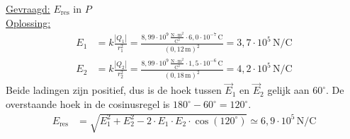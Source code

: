 \documentclass{ximera}
\begin{document}
\begin{exercise}
\begin{solution}
        \underline{Gevraagd:} $E_{\text{res}}$ in $P$\\

        \underline{Oplossing:}\\
        \begin{align*}
            E_{1} &= k \frac{|Q_{1}|}{r_{1}^{2}} = \frac{8{,}99 \cdot 10^{9} \, \mathrm{\frac{N \cdot m^2}{C^2}} \cdot 6{,}0 \cdot 10^{-7} \, \mathrm{C}}{(0{,}12 \, \mathrm{m})^{2}} = 3{,}7 \cdot 10^{5} \, \mathrm{N/C} \\
            E_{2} &= k \frac{|Q_{2}|}{r_{2}^{2}} = \frac{8{,}99 \cdot 10^{9} \, \mathrm{\frac{N \cdot m^2}{C^2}} \cdot 1{,}5 \cdot 10^{-6} \, \mathrm{C}}{(0{,}18 \, \mathrm{m})^{2}} = 4{,}2 \cdot 10^{5} \, \mathrm{N/C}
        \end{align*}
        Beide ladingen zijn positief, dus is de hoek tussen $\vec{E}_1$ en $\vec{E}_2$ gelijk aan $60^\circ$. De overstaande hoek in de cosinusregel is $180^\circ - 60^\circ = 120^\circ$.
        \begin{align*}
            E_{\text{res}} &= \sqrt{E_1^{2} + E_2^{2} - 2 \cdot E_1 \cdot E_2 \cdot \cos(120^\circ)} \simeq \boxed{6{,}9 \cdot 10^{5} \, \mathrm{N/C}}
        \end{align*}
    \end{solution}
\end{exercise}
\end{document}

